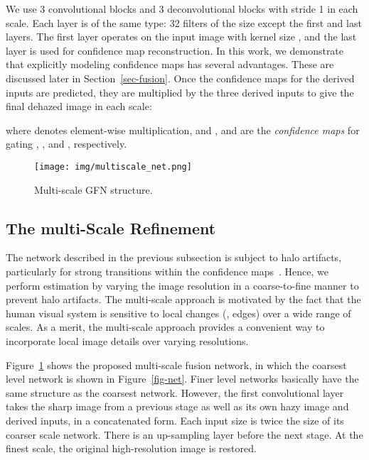 \documentclass[10pt,twocolumn,letterpaper]{article}
\begin{document}
We use 3 convolutional blocks and 3 deconvolutional blocks with stride 1 in each scale. Each layer is of the same type: 32 filters of the size  except the first and last layers.
The first layer operates on the input image with kernel size , and the last layer is used for confidence map reconstruction.
In this work, we demonstrate that explicitly modeling
confidence maps has several advantages. These are discussed later in Section~\ref{sec-fusion}.
Once the confidence maps for the derived inputs are predicted, they are multiplied
by the three derived inputs to give the final dehazed image in each scale:

where  denotes element-wise multiplication, and , and  are the \textit{confidence maps} for gating , , and , respectively.


\begin{figure}[t]\footnotesize
	\begin{center}
		\texttt{[image: img/multiscale\_net.png]}
	\end{center}
	\vspace{-0.1cm}
	\caption{Multi-scale GFN structure.
	}
	\vspace{-4mm}
	\label{fig-multiscale-net}
\end{figure}
\subsection{The multi-Scale Refinement}
\label{sec-multiscale}
The network described in the previous subsection is subject to halo artifacts,
particularly for strong transitions within the confidence maps~\cite{ancuti2013single,choi2015referenceless}.
Hence, we perform estimation by varying the image resolution in a coarse-to-fine manner to prevent halo artifacts.
The multi-scale approach is motivated by the fact that the
human visual system is sensitive to local changes (\eg, edges)
over a wide range of scales. As a merit, the multi-scale approach
provides a convenient way to incorporate local image details
over varying resolutions.


Figure~\ref{fig-multiscale-net} shows the proposed multi-scale fusion network, in which
the coarsest level network is shown in Figure~\ref{fig-net}.
Finer level networks basically have the same structure as the coarsest network. However, the first convolutional layer takes the sharp image from a previous stage as well as its
own hazy image and derived inputs, in a concatenated form.
Each input size is twice the size of its coarser scale network.
There is an up-sampling layer before the next stage. At the finest scale, the original high-resolution image is restored.
\end{document}

